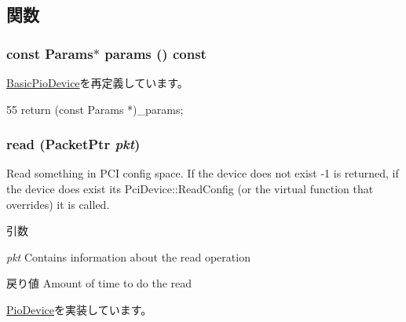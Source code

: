 \subsection{関数}
\hypertarget{classPciConfigAll_acd3c3feb78ae7a8f88fe0f110a718dff}{
\subsubsection[{params}]{\setlength{\rightskip}{0pt plus 5cm}const {\bf Params}$\ast$ params () const}}
\label{classPciConfigAll_acd3c3feb78ae7a8f88fe0f110a718dff}


\hyperlink{classBasicPioDevice_acd3c3feb78ae7a8f88fe0f110a718dff}{BasicPioDevice}を再定義しています。


\begin{DoxyCode}
55 { return (const Params *)_params; }
\end{DoxyCode}
\hypertarget{classPciConfigAll_a613ec7d5e1ec64f8d21fec78ae8e568e}{
\subsubsection[{read}]{ read ({\bf PacketPtr} {\em pkt})}}
\label{classPciConfigAll_a613ec7d5e1ec64f8d21fec78ae8e568e}
Read something in PCI config space. If the device does not exist -\/1 is returned, if the device does exist its PciDevice::ReadConfig (or the virtual function that overrides) it is called. 
\begin{DoxyParams}{引数}
\item[{\em pkt}]Contains information about the read operation \end{DoxyParams}
\begin{DoxyReturn}{戻り値}
Amount of time to do the read 
\end{DoxyReturn}


\hyperlink{classPioDevice_a842312590432036092c422c87a442358}{PioDevice}を実装しています。


